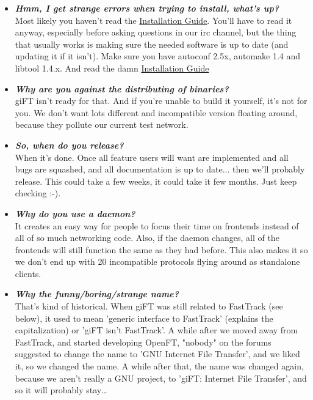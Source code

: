 \documentclass[10pt]{article}
\newcommand{\question}[1]{\item\textbf{\emph{#1}}}
\begin{document}
\begin{itemize}
\question {Hmm, I get strange errors when trying to install,
what's up?}\\
Most likely you haven't read the
\href{http://gift.sourceforge.net/docs/?document=install.html}{Installation
Guide}. You'll have to read it anyway, especially before asking
questions in our irc channel, but the thing that usually works is
making sure the needed software is up to date (and updating it if
it isn't). Make sure you have autoconf 2.5x, automake 1.4 and
libtool 1.4.x. And read the damn
\href{http://gift.sourceforge.net/docs/?document=install.html}{Installation
Guide}  

\question {Why are you against the distributing of binaries?}\\
giFT isn't ready for that. And if you're unable to build it
yourself, it's not for you.  We don't want lots different and
incompatible version floating around, because they pollute our
current test network.

\question {So, when do you release?}\\
When it's done. Once all feature users will want are implemented
and all bugs are squashed, and all documentation is up to date...
then we'll probably release. This could take a few weeks, it could
take it few months. Just keep checking :-).

\question {Why do you use a daemon?}\\
It creates an easy way for people to focus their time on frontends
instead of all of so much networking code. Also, if the daemon
changes, all of the frontends will still function the same as they
had before. This also makes it so we don't end up with 20
incompatible protocols flying around as standalone clients.

\question {Why the funny/boring/strange name?}\\
That's kind of historical. When giFT was still related to
FastTrack (see below), it used to mean 'generic interface to
FastTrack' (explains the capitalization) or 'giFT isn't
FastTrack'. A while after we moved away from FastTrack, and
started developing OpenFT, "nobody" on the forums suggested to
change the name to 'GNU Internet File Transfer', and we liked it,
so we changed the name.  A while after that, the name was changed
again, because we aren't really a GNU project, to 'giFT: Internet
File Transfer', and so it will probably stay\ldots


\end{itemize}
\end{document}
